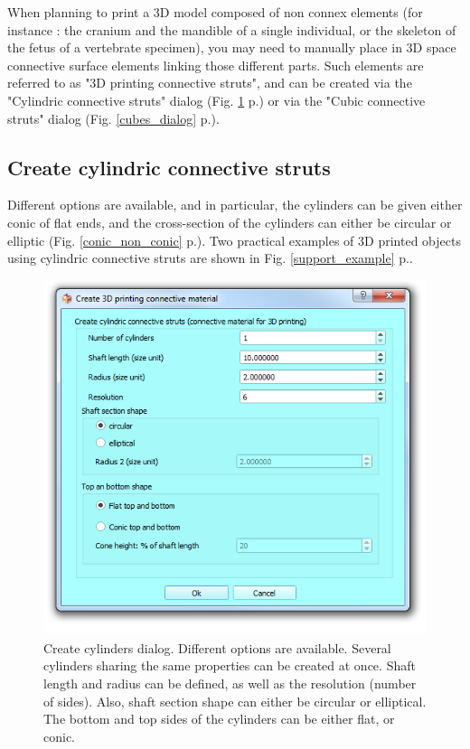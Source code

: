 When planning to print a 3D model composed of non connex elements (for instance : the cranium and the mandible of a single individual, or the skeleton of the fetus of a vertebrate specimen), you may need to manually place in 3D space connective surface elements linking those different parts. Such elements are referred to as "3D printing connective struts", and can be created via the "Cylindric connective struts" dialog (Fig. \ref{cylinders_dialog} p.\pageref{cylinders_dialog}) or via the "Cubic connective struts" dialog (Fig. \ref{cubes_dialog} p.\pageref{cubes_dialog}). 

\subsection{Create cylindric connective struts}
Different options are available, and in particular, the cylinders can be given either conic of flat ends, and the cross-section of the cylinders can either be circular or elliptic (Fig. \ref{conic_non_conic} p.\pageref{conic_non_conic}). 
Two practical examples of 3D printed objects using cylindric connective struts are shown in Fig. \ref{support_example} p.\pageref{support_example}.
\begin{figure}
  \centering
  \includegraphics[scale=0.5]{images/09/create_3D_primitives/cylinders_dialog.png} 
	\caption{Create cylinders dialog. Different options are available. Several cylinders sharing the same properties can be created at once. Shaft length and radius can be defined, as well as the resolution (number of sides). Also, shaft section shape can either be circular or elliptical. The bottom and top sides of the cylinders can be either flat, or conic.}
 \label{cylinders_dialog}
\end{figure}

